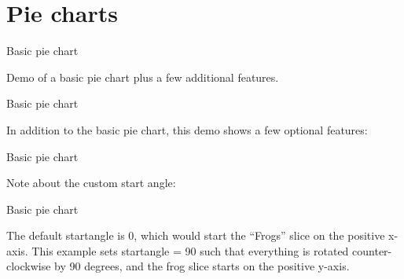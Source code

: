 \documentclass{beamer}
\begin{document}
\section{Pie charts}

\begin{frame}[t]{Basic pie chart}

Demo of a basic pie chart plus a few additional features.

\end{frame}


\begin{frame}[t]{Basic pie chart}

In addition to the basic pie chart, this demo shows a few optional features:

\end{frame}


\begin{frame}[t]{Basic pie chart}

Note about the custom start angle:

\end{frame}


\begin{frame}[t]{Basic pie chart}

The default startangle is 0, which would start the “Frogs” slice on the
positive x-axis. This example sets startangle = 90 such that everything is
rotated counter-clockwise by 90 degrees, and the frog slice starts on the
positive y-axis.

\end{frame}
\end{document}
